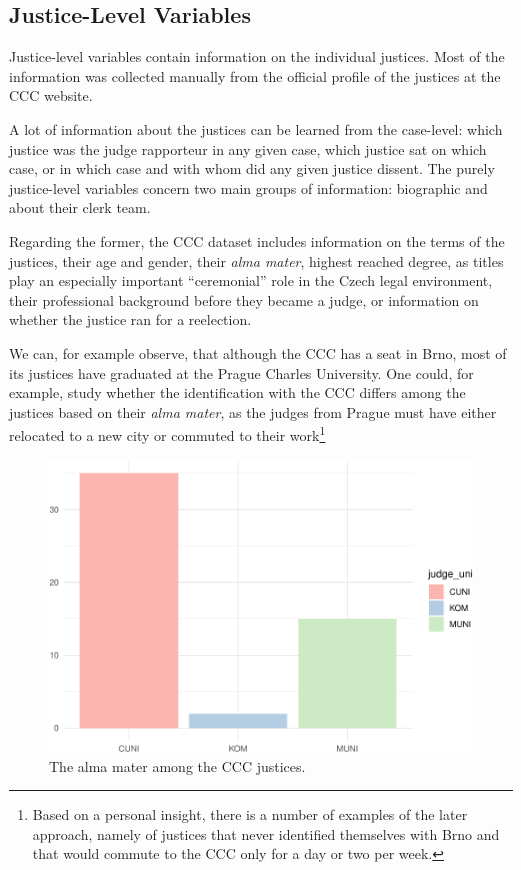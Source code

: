 \documentclass[
  11pt,
]{article}
\begin{document}
\hypertarget{justice-level-variables}{%
\subsection{Justice-Level Variables}\label{justice-level-variables}}

Justice-level variables contain information on the individual justices.
Most of the information was collected manually from the official profile
of the justices at the CCC website.

A lot of information about the justices can be learned from the
case-level: which justice was the judge rapporteur in any given case,
which justice sat on which case, or in which case and with whom did any
given justice dissent. The purely justice-level variables concern two
main groups of information: biographic and about their clerk team.

Regarding the former, the CCC dataset includes information on the terms
of the justices, their age and gender, their \emph{alma mater}, highest
reached degree, as titles play an especially important ``ceremonial''
role in the Czech legal environment, their professional background
before they became a judge, or information on whether the justice ran
for a reelection.

We can, for example observe, that although the CCC has a seat in Brno,
most of its justices have graduated at the Prague Charles University.
One could, for example, study whether the identification with the CCC
differs among the justices based on their \emph{alma mater}, as the
judges from Prague must have either relocated to a new city or commuted
to their work\footnote{Based on a personal insight, there is a number of
  examples of the later approach, namely of justices that never
  identified themselves with Brno and that would commute to the CCC only
  for a day or two per week.}

\begin{figure}
\centering
\includegraphics{The_Czech_Constitutional_Court_Dataset_files/figure-latex/alma-1.pdf}
\caption{The alma mater among the CCC justices.}
\end{figure}
\end{document}
